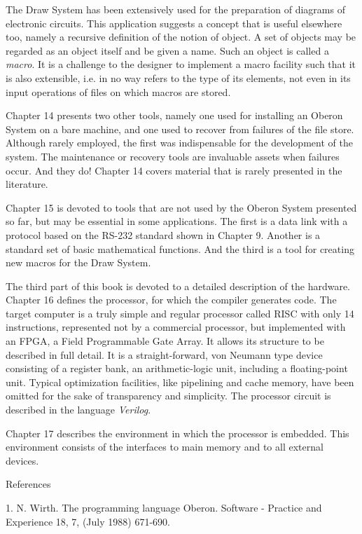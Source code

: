 The Draw System has been extensively used for the preparation of
diagrams of electronic circuits. This application suggests a concept
that is useful elsewhere too, namely a recursive definition of the
notion of object. A set of objects may be regarded as an object itself
and be given a name. Such an object is called a \emph{macro}. It is a
challenge to the designer to implement a macro facility such that it
is also extensible, i.e. in no way refers to the type of its elements,
not even in its input operations of files on which macros are stored.

Chapter 14 presents two other tools, namely one used for installing an
Oberon System on a bare machine, and one used to recover from failures
of the file store. Although rarely employed, the first was
indispensable for the development of the system. The maintenance or
recovery tools are invaluable assets when failures occur. And they do!
Chapter 14 covers material that is rarely presented in the literature.

Chapter 15 is devoted to tools that are not used by the Oberon System
presented so far, but may be essential in some applications. The first
is a data link with a protocol based on the RS-232 standard shown in
Chapter 9. Another is a standard set of basic mathematical
functions. And the third is a tool for creating new macros for the
Draw System.

The third part of this book is devoted to a detailed description of
the hardware. Chapter 16 defines the processor, for which the compiler
generates code. The target computer is a truly simple and regular
processor called RISC with only 14 instructions, represented not by a
commercial processor, but implemented with an FPGA, a Field
Programmable Gate Array. It allows its structure to be described in
full detail. It is a straight-forward, von Neumann type device
consisting of a register bank, an arithmetic-logic unit, including a
floating-point unit. Typical optimization facilities, like pipelining
and cache memory, have been omitted for the sake of transparency and
simplicity. The processor circuit is described in the language
\emph{Verilog}.

Chapter 17 describes the environment in which the processor is
embedded. This environment consists of the interfaces to main memory
and to all external devices.

References

1. N. Wirth. The programming language Oberon. Software - Practice and Experience 18, 7, (July 1988) 671-690.

